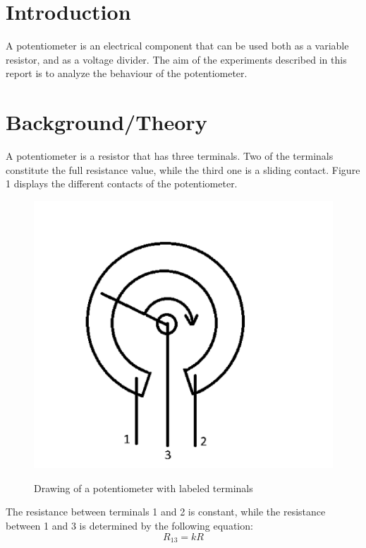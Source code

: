 \documentclass[a4paper]{article}
\begin{document}
\section{Introduction}
A potentiometer is an electrical component that can be used both as a variable
resistor, and as a voltage divider. The aim of the experiments described in this
report is to analyze the behaviour of the potentiometer.
\section{Background/Theory}
A potentiometer is a resistor that has three terminals. Two of the terminals
constitute the full resistance value, while the third one is a sliding contact.
Figure 1 displays the different contacts of the potentiometer.
\begin{figure}[!ht]
    \begin{minipage}{0.4\textwidth}
        \includegraphics[width = \textwidth]{potterminals.png}
       \label{fig:1}
        \caption{Drawing of a potentiometer with labeled terminals}    
    \end{minipage}
\end{figure}

The resistance between terminals 1 and 2 is constant, while the resistance
between 1 and 3 is determined by the following equation:
\begin{equation}
    R_{13} = kR
\end{equation}
\end{document}
